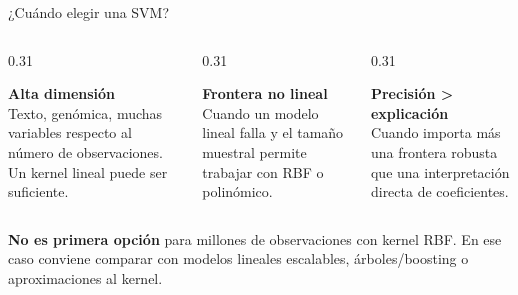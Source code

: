 \begin{frame}{¿Cuándo elegir una SVM?}
\footnotesize
\begin{columns}[T,onlytextwidth]
\begin{column}{0.31\textwidth}
\begin{ccdebox}
\centering
\textbf{Alta dimensión}\\[0.12cm]
Texto, genómica, muchas variables respecto al número de observaciones. Un kernel lineal puede ser suficiente.
\end{ccdebox}
\end{column}
\begin{column}{0.31\textwidth}
\begin{ccdebox}
\centering
\textbf{Frontera no lineal}\\[0.12cm]
Cuando un modelo lineal falla y el tamaño muestral permite trabajar con RBF o polinómico.
\end{ccdebox}
\end{column}
\begin{column}{0.31\textwidth}
\begin{ccdebox}
\centering
\textbf{Precisión > explicación}\\[0.12cm]
Cuando importa más una frontera robusta que una interpretación directa de coeficientes.
\end{ccdebox}
\end{column}
\end{columns}
\vspace{0.22cm}
\begin{keybox}
\textbf{No es primera opción} para millones de observaciones con kernel RBF. En ese caso conviene comparar con modelos lineales escalables, árboles/boosting o aproximaciones al kernel.
\end{keybox}
\end{frame}

